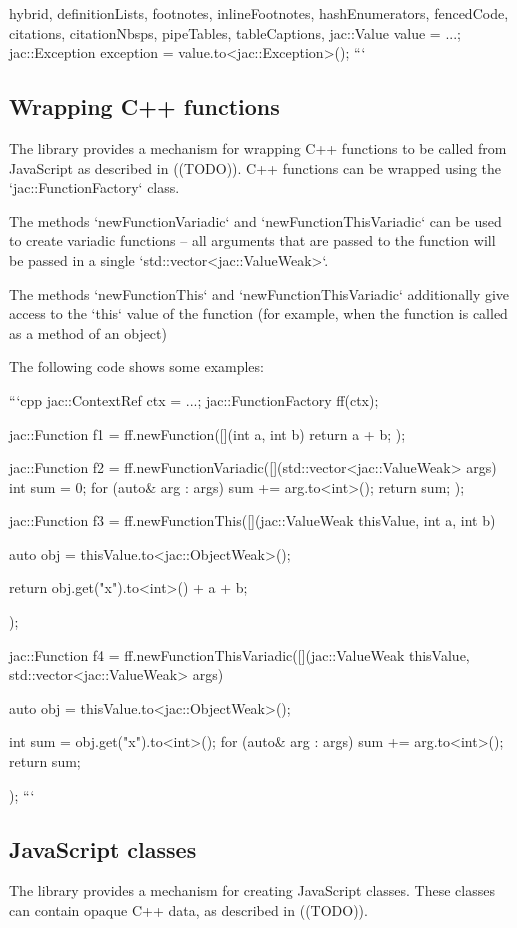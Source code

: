 \begin{markdown*}{%
  hybrid,
  definitionLists,
  footnotes,
  inlineFootnotes,
  hashEnumerators,
  fencedCode,
  citations,
  citationNbsps,
  pipeTables,
  tableCaptions,
}
jac::Value value = ...;
jac::Exception exception = value.to<jac::Exception>();
```

\subsection{Wrapping C++ functions}

The library provides a mechanism for wrapping C++ functions to be called from JavaScript as described in ((TODO)). C++ functions can be wrapped using the `jac::FunctionFactory` class.

The methods `newFunctionVariadic` and `newFunctionThisVariadic` can be used to create variadic functions -- all arguments that are
passed to the function will be passed in a single `std::vector<jac::ValueWeak>`.

The methods `newFunctionThis` and `newFunctionThisVariadic` additionally give access to the `this` value of the function (for example,
when the function is called as a method of an object)

The following code shows some examples:

```cpp
jac::ContextRef ctx = ...;
jac::FunctionFactory ff(ctx);

jac::Function f1 = ff.newFunction([](int a, int b) { return a + b; });

jac::Function f2 = ff.newFunctionVariadic([](std::vector<jac::ValueWeak> args) {
    int sum = 0;
    for (auto& arg : args) {
        sum += arg.to<int>();
    }
    return sum;
});

jac::Function f3 = ff.newFunctionThis([](jac::ValueWeak thisValue, int a, int b) {
    auto obj = thisValue.to<jac::ObjectWeak>();

    return obj.get("x").to<int>() + a + b;
});

jac::Function f4 = ff.newFunctionThisVariadic([](jac::ValueWeak thisValue, std::vector<jac::ValueWeak> args) {
    auto obj = thisValue.to<jac::ObjectWeak>();

    int sum = obj.get("x").to<int>();
    for (auto& arg : args) {
        sum += arg.to<int>();
    }
    return sum;
});
```

\subsection{JavaScript classes}

The library provides a mechanism for creating JavaScript classes. These classes can contain opaque C++ data, as described in ((TODO)).


\end{markdown*}
